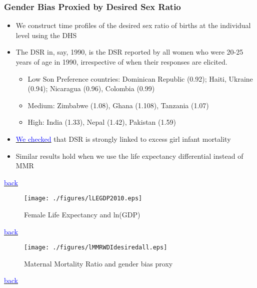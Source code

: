 \documentclass[10pt,letterpaper,subeqn]{beamer}
\begin{document}
\begin{frame}[label=DSR]
\frametitle{Gender Bias Proxied by Desired Sex Ratio}
\begin{itemize}
\item We construct time profiles of the desired sex ratio of births at the individual level using the DHS
\item The DSR in, say, 1990, is the DSR reported by all women who were 20-25 years of age in 1990, irrespective of when their responses are elicited.
\begin{itemize}
\item Low Son Preference countries: Dominican Republic (0.92); Haiti, Ukraine (0.94); Nicaragua (0.96), Colombia (0.99) 
\item Medium: Zimbabwe (1.08), Ghana (1.108), Tanzania (1.07) 
\item High: India (1.33), Nepal (1.42), Pakistan (1.59)
\end{itemize}
\item \hyperlink{DSRIMR}{\textcolor{blue}{We checked}} that DSR is strongly linked to excess girl infant mortality
\item Similar results hold when we use the life expectancy differential instead of MMR
\end{itemize}
{\footnotesize \hyperlink{CC}{\textcolor{blue}{back}}}
\end{frame}

\begin{frame}[label=trends,plain]
\begin{figure}
\caption{Female Life Expectancy and ln(GDP)}
\texttt{[image: ./figures/lLEGDP2010.eps]}
\end{figure}
\vspace{-8mm}
{\footnotesize \hyperlink{CC1}{\textcolor{blue}{back}}}
\end{frame}

\begin{frame}[label=MMRBias,plain]
\begin{figure}
\caption{Maternal Mortality Ratio and gender bias proxy}
\texttt{[image: ./figures/lMMRWDIdesiredall.eps]}
\end{figure}
\vspace{-8mm}
{\footnotesize \hyperlink{CC1}{\textcolor{blue}{back}}}
\end{frame}
\end{document}
